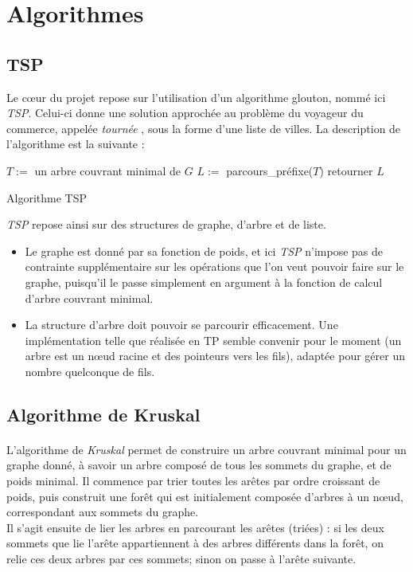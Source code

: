 \documentclass[a4paper]{article}
\begin{document}
\bigskip

\section{Algorithmes}

\subsection{TSP}
Le cœur du projet repose sur l'utilisation d'un algorithme glouton, nommé ici \emph{TSP}. Celui-ci donne une solution approchée au problème du voyageur du commerce, appelée \textit{tournée} , sous la forme d'une liste de villes. La description de l'algorithme est la suivante :

\begin{algorithm}[H]
  \SetAlgoLined
  $T := $ un arbre couvrant minimal de $G$\;
  $L := $ parcours\_préfixe($T$)\;
  retourner $L$\;
  \caption{Algorithme TSP}
\end{algorithm}

\emph{TSP} repose ainsi sur des structures de graphe, d'arbre et de liste. \\
\begin{itemize}
\item Le graphe est donné par sa fonction de poids, et ici \emph{TSP} n'impose pas de contrainte supplémentaire sur les opérations que l'on veut pouvoir faire sur le graphe, puisqu'il le passe simplement en argument à la fonction de calcul d'arbre couvrant minimal.
\item La structure d'arbre doit pouvoir se parcourir efficacement. Une implémentation telle que réalisée en TP semble convenir pour le moment (un arbre est un nœud racine et des pointeurs vers les fils), adaptée pour gérer un nombre quelconque de fils.
\end{itemize}

\subsection{Algorithme de Kruskal}
\label{sse:kruskalAlgo}

\paragraph*{} L'algorithme de \emph{Kruskal} permet de construire un arbre couvrant minimal pour un graphe donné, à savoir un arbre composé de tous les sommets du graphe, et de poids minimal. Il commence par trier toutes les arêtes par ordre croissant de poids, puis construit une forêt qui est initialement composée d'arbres à un nœud, correspondant aux sommets du graphe. \\
Il s'agit ensuite de lier les arbres en parcourant les arêtes (triées) : si les deux sommets que lie l'arête appartiennent à des arbres différents dans la forêt, on relie ces deux arbres par ces sommets; sinon on passe à l'arête suivante.
\end{document}
